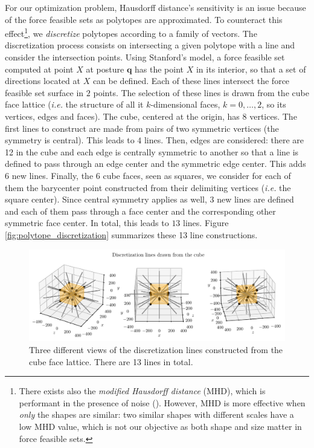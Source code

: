 For our optimization problem, Hausdorff distance's sensitivity is an issue because of the force feasible sets as polytopes are approximated. To counteract this effect\footnote{There exists also the \emph{modified Hausdorff distance} (MHD), which is performant in the presence of noise (\cite{dubuissonModifiedHausdorffDistance1994}). However, MHD is more effective when \emph{only} the shapes are similar: two similar shapes with different scales have a low MHD value, which is not our objective as both shape and size matter in force feasible sets.}, we \emph{discretize} polytopes according to a family of vectors. The discretization process consists on intersecting a given polytope with a line and consider the intersection points. Using Stanford's model, a force feasible set computed at point $X$ at posture $\mathbf{q}$ has the point $X$ in its interior, so that a set of directions located at $X$ can be defined. Each of these lines intersect the force feasible set surface in $2$ points. 
The selection of these lines is drawn from the cube face lattice (\emph{i.e.} the structure of all it $k$-dimensional faces, $k=0, \dots, 2$, so its vertices, edges and faces). 
The cube, centered at the origin, has $8$ vertices. The first lines to construct are made from pairs of two symmetric vertices (the symmetry is central). This leads to $4$ lines. Then, edges are considered: there are 12 in the cube and each edge is centrally symmetric to another so that a line is defined to pass through an edge center and the symmetric edge center. This adds $6$ new lines. Finally, the $6$ cube faces, seen as squares, we consider for each of them the barycenter point constructed from their delimiting vertices (\emph{i.e.} the square center). Since central symmetry applies as well, $3$ new lines are defined and each of them pass through a face center and the corresponding other symmetric face center. In total, this leads to $13$ lines. Figure \ref{fig:polytope_discretization} summarizes these 13 line constructions.

\begin{figure}[!htb]
    \centering
    \captionsetup{justification=centering}
    \begin{minipage}{\linewidth}
        \centering
        \includegraphics[trim={0 0 0 20}, clip, width=1\linewidth]{img/chapter_4/imgs_discretization/discretization_lines_from_cube.pdf}
    \end{minipage}
    \caption{Three different views of the discretization lines constructed from the cube face lattice. There are 13 lines in total.}
    \label{fig:discretized_directions}
\end{figure}

